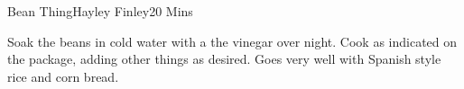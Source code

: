 \begin{recipe}{Bean Thing}{Hayley Finley}{20 Mins}

  Soak the beans in cold water with a the vinegar over night. Cook as
  indicated on the package, adding other things as desired. Goes very well
  with Spanish style rice and corn bread.
\end{recipe}
